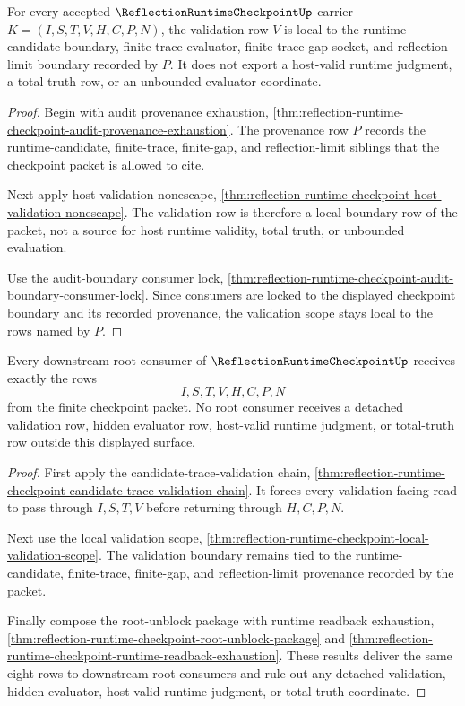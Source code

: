 \begin{theorem}
\label{thm:reflection-runtime-checkpoint-local-validation-scope}
For every accepted $\ReflectionRuntimeCheckpointUp$ carrier $K=(I,S,T,V,H,C,P,N)$, the validation row $V$ is local to the runtime-candidate boundary, finite trace evaluator, finite trace gap socket, and reflection-limit boundary recorded by $P$. It does not export a host-valid runtime judgment, a total truth row, or an unbounded evaluator coordinate.
\end{theorem}
\begin{proof}
Begin with audit provenance exhaustion, \autoref{thm:reflection-runtime-checkpoint-audit-provenance-exhaustion}. The provenance row $P$ records the runtime-candidate, finite-trace, finite-gap, and reflection-limit siblings that the checkpoint packet is allowed to cite.

Next apply host-validation nonescape, \autoref{thm:reflection-runtime-checkpoint-host-validation-nonescape}. The validation row is therefore a local boundary row of the packet, not a source for host runtime validity, total truth, or unbounded evaluation.

Use the audit-boundary consumer lock, \autoref{thm:reflection-runtime-checkpoint-audit-boundary-consumer-lock}. Since consumers are locked to the displayed checkpoint boundary and its recorded provenance, the validation scope stays local to the rows named by $P$.
\end{proof}

\begin{theorem}
\label{thm:reflection-runtime-checkpoint-root-consumer-exhaustion}
Every downstream root consumer of $\ReflectionRuntimeCheckpointUp$ receives exactly the rows
$$
I,S,T,V,H,C,P,N
$$
from the finite checkpoint packet. No root consumer receives a detached validation row, hidden evaluator row, host-valid runtime judgment, or total-truth row outside this displayed surface.
\end{theorem}
\begin{proof}
First apply the candidate-trace-validation chain, \autoref{thm:reflection-runtime-checkpoint-candidate-trace-validation-chain}. It forces every validation-facing read to pass through $I,S,T,V$ before returning through $H,C,P,N$.

Next use the local validation scope, \autoref{thm:reflection-runtime-checkpoint-local-validation-scope}. The validation boundary remains tied to the runtime-candidate, finite-trace, finite-gap, and reflection-limit provenance recorded by the packet.

Finally compose the root-unblock package with runtime readback exhaustion, \autoref{thm:reflection-runtime-checkpoint-root-unblock-package} and \autoref{thm:reflection-runtime-checkpoint-runtime-readback-exhaustion}. These results deliver the same eight rows to downstream root consumers and rule out any detached validation, hidden evaluator, host-valid runtime judgment, or total-truth coordinate.
\end{proof}

